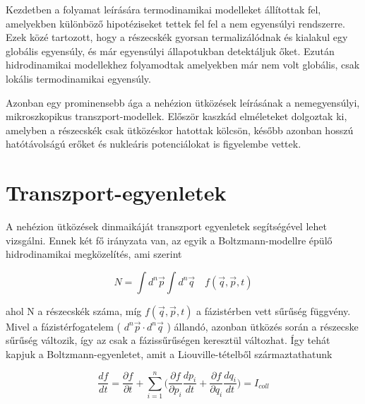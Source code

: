 \documentclass[a4paper,12pt]{article}
\begin{document}
\vspace{5mm}

\par Kezdetben a folyamat leírására termodinamikai modelleket állítottak fel, amelyekben különböző hipotéziseket tettek fel fel a nem egyensúlyi rendszerre. Ezek közé tartozott, hogy a részecskék gyorsan termalizálódnak és kialakul egy globális egyensúly, és már egyensúlyi állapotukban detektáljuk őket. Ezután hidrodinamikai modellekhez folyamodtak amelyekben már nem volt globális, csak lokális termodinamikai egyensúly.

\vspace{5mm}

\par Azonban egy prominensebb ága a nehézion ütközések leírásának a nemegyensúlyi, mikroszkopikus transzport-modellek. Először kaszkád elméleteket dolgoztak ki, amelyben a részecskék csak ütközéskor hatottak kölcsön, később azonban hosszú hatótávolságú erőket és nukleáris potenciálokat is figyelembe vettek.

\vspace{5mm}

\section{Transzport-egyenletek}

\par A nehézion ütközések dinmaikáját transzport egyenletek segítségével lehet vizsgálni. Ennek két fő irányzata van, az egyik a Boltzmann-modellre épülő hidrodinamikai megközelítés, ami szerint 

\vspace{5mm}

\begin{equation}
	N = \int d^{n}\vec{p} \int d^{n}\vec{q} \quad f(\vec{q}, \vec{p}, t)
\end{equation}

\vspace{5mm}

ahol N a részecskék száma, míg $f(\vec{q}, \vec{p}, t)$ a fázistérben vett sűrűség függvény. Mivel a fázistérfogatelem ( $d^{n}\vec{p}\cdot d^{n}\vec{q}$ ) állandó, azonban ütközés során a részecske sűrűség változik, így az csak a fázissűrűségen keresztül változhat. Így tehát kapjuk a Boltzmann-egyenletet, amit a Liouville-tételből származtathatunk

\vspace{5mm}

\begin{equation}
	\frac{df}{dt} = \frac{\partial f}{\partial t} + \sum_{i = 1}^{n}\Big(\frac{\partial f}{\partial p_{i}}\frac{dp_{i}}{dt} + \frac{\partial f}{\partial q_{i}}\frac{dq_{i}}{dt}\Big) = I_{coll}
\end{equation}
\end{document}
